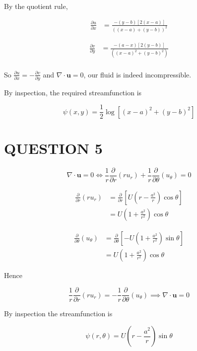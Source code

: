 \documentclass[a4paper]{article}
\begin{document}
By the quotient rule,

\begin{align*}
\frac{\partial u }{\partial x}& = \frac{-(y-b)[2(x-a)]}{( (x-a) + (y-b))^{2}} 
\end{align*}

\begin{align*}
\frac{\partial v }{\partial y} & = \frac{-(a-x)[2(y-b)] }{( (x-a)^{2} + (y-b)^{2}   )} \\
\end{align*}

So $  \frac{\partial u }{\partial x} = - \frac{\partial v }{\partial y} $ and $  \nabla \cdot \mathbf{u} = 0 $, our fluid is indeed incompressible.

By inspection, the required streamfunction is 

\[ \psi(x,y) = \frac{1}{2} \log \left[   (x-a)^{2} + (y-b)^{2}  \right]  \]

 


\section{QUESTION 5}

\[ \nabla \cdot \mathbf{u} = 0 \iff  \frac{1}{r} \frac{\partial }{\partial r}(ru_{r}) + \frac{1}{r} \frac{\partial }{\partial \theta}(u_{\theta}) = 0  \]

\begin{align*}
\frac{\partial }{\partial r}(ru_{r}) & = \frac{\partial }{\partial r} \left[  U \left(  r - \frac{a^{2}}{r} \right) \cos \theta \right]    \\
& = U \left(  1 + \frac{a^{2}}{r^{2}} \right) \cos \theta 
\end{align*}

\begin{align*}
\frac{\partial }{\partial \theta}(u_{\theta}) & = \frac{\partial }{\partial \theta} \left[ -U \left( 1 + \frac{a^{2}}{r^{2}} \right)  \sin \theta \right]    \\
& = U \left( 1 + \frac{a^{2}}{r^{2}} \right)  \cos \theta
\end{align*}

Hence 

\[  \frac{1}{r} \frac{\partial }{\partial r}(ru_{r}) = - \frac{1}{r} \frac{\partial }{\partial \theta}(u_{\theta}) \implies \nabla \cdot \mathbf{u} = 0  \]


By inspection the streamfunction is

\[ \psi(r,\theta) = U \left(  r - \frac{a^{2}}{r} \right) \sin \theta  \]
\end{document}
